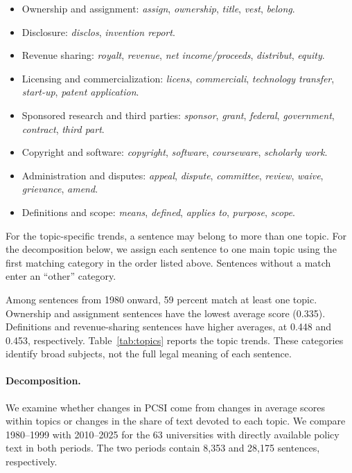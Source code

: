 \documentclass[11pt]{article}
\begin{document}
\begin{itemize}
\item Ownership and assignment: \emph{assign}, \emph{ownership}, \emph{title}, \emph{vest}, \emph{belong}.
\item Disclosure: \emph{disclos}, \emph{invention report}.
\item Revenue sharing: \emph{royalt}, \emph{revenue}, \emph{net income/proceeds}, \emph{distribut}, \emph{equity}.
\item Licensing and commercialization: \emph{licens}, \emph{commerciali}, \emph{technology transfer}, \emph{start-up}, \emph{patent application}.
\item Sponsored research and third parties: \emph{sponsor}, \emph{grant}, \emph{federal}, \emph{government}, \emph{contract}, \emph{third part}.
\item Copyright and software: \emph{copyright}, \emph{software}, \emph{courseware}, \emph{scholarly work}.
\item Administration and disputes: \emph{appeal}, \emph{dispute}, \emph{committee}, \emph{review}, \emph{waive}, \emph{grievance}, \emph{amend}.
\item Definitions and scope: \emph{means}, \emph{defined}, \emph{applies to}, \emph{purpose}, \emph{scope}.
\end{itemize}

For the topic-specific trends, a sentence may belong to more than one topic. For the decomposition below, we assign each sentence to one main topic using the first matching category in the order listed above. Sentences without a match enter an ``other'' category.

Among sentences from 1980 onward, 59 percent match at least one topic. Ownership and assignment sentences have the lowest average score (0.335). Definitions and revenue-sharing sentences have higher averages, at 0.448 and 0.453, respectively. Table~\ref{tab:topics} reports the topic trends. These categories identify broad subjects, not the full legal meaning of each sentence.



\paragraph{Decomposition.}
We examine whether changes in PCSI come from changes in average scores within topics or changes in the share of text devoted to each topic. We compare 1980--1999 with 2010--2025 for the 63 universities with directly available policy text in both periods. The two periods contain 8,353 and 28,175 sentences, respectively.
\end{document}
